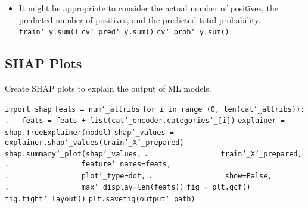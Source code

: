 \begin{itemize}
\item
It might be appropriate to consider
the actual number of positives,
the predicted number of positives,
and the predicted total probability.\newline
\texttt{train\char`_y.sum()}\newline
\texttt{cv\char`_pred\char`_y.sum()}\newline
\texttt{cv\char`_prob\char`_y.sum()}\newline

\end{itemize}

\subsection{SHAP Plots}

Create SHAP plots to explain the output of ML models.

\texttt{import shap}\newline
\newline
\texttt{feats = num\char`_attribs}\newline
\texttt{for i in range (0, len(cat\char`_attribs)):}\newline
\texttt{.~~~feats = feats + list(cat\char`_encoder.categories\char`_[i])}\newline
\newline
\texttt{explainer = shap.TreeExplainer(model)}\newline
\texttt{shap\char`_values = explainer.shap\char`_values(train\char`_X\char`_prepared)}\newline
\newline
\texttt{shap.summary\char`_plot(shap\char`_values,}\newline
\texttt{.~~~~~~~~~~~~~~~~~train\char`_X\char`_prepared,}\newline
\texttt{.~~~~~~~~~~~~~~~~~feature\char`_names=feats,}\newline
\texttt{.~~~~~~~~~~~~~~~~~plot\char`_type=\textquotesingle dot\textquotesingle,}\newline
\texttt{.~~~~~~~~~~~~~~~~~show=False,}\newline
\texttt{.~~~~~~~~~~~~~~~~~max\char`_display=len(feats))}\newline
\texttt{fig = plt.gcf()}\newline
\texttt{fig.tight\char`_layout()}\newline
\texttt{plt.savefig(output\char`_path)}\newline

